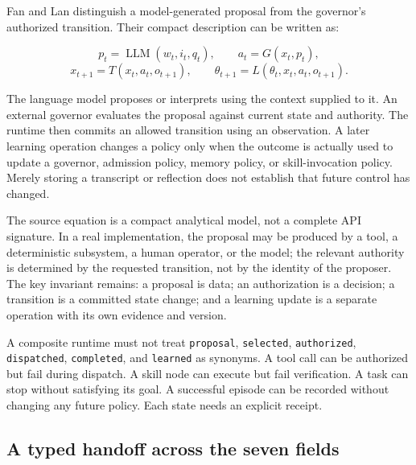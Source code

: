 Fan and Lan distinguish a model-generated proposal from the governor's authorized transition. Their compact description can be written as:

\[
 p_t = \operatorname{LLM}(w_t,i_t,q_t), \qquad
 a_t = G(x_t,p_t),
\]
\[
 x_{t+1}=T(x_t,a_t,o_{t+1}), \qquad
 \theta_{t+1}=L(\theta_t,x_t,a_t,o_{t+1}).
\]

The language model proposes or interprets using the context supplied to it. An external governor evaluates the proposal against current state and authority. The runtime then commits an allowed transition using an observation. A later learning operation changes a policy only when the outcome is actually used to update a governor, admission policy, memory policy, or skill-invocation policy. Merely storing a transcript or reflection does not establish that future control has changed.

The source equation is a compact analytical model, not a complete API signature. In a real implementation, the proposal may be produced by a tool, a deterministic subsystem, a human operator, or the model; the relevant authority is determined by the requested transition, not by the identity of the proposer. The key invariant remains: a proposal is data; an authorization is a decision; a transition is a committed state change; and a learning update is a separate operation with its own evidence and version.

\begin{warningbox}
A composite runtime must not treat \texttt{proposal}, \texttt{selected}, \texttt{authorized}, \texttt{dispatched}, \texttt{completed}, and \texttt{learned} as synonyms. A tool call can be authorized but fail during dispatch. A skill node can execute but fail verification. A task can stop without satisfying its goal. A successful episode can be recorded without changing any future policy. Each state needs an explicit receipt.
\end{warningbox}

\subsection{A typed handoff across the seven fields}
\label{subsec:ch18-typed-handoff}

